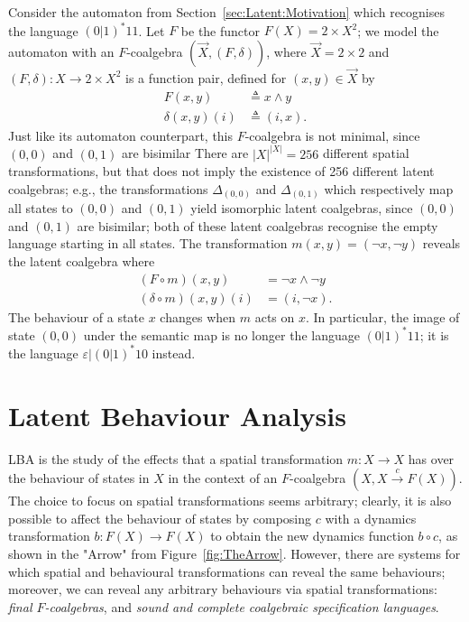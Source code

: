 \begin{example}
\label{ex:Latent:TheExample}
Consider the automaton from Section~\ref{sec:Latent:Motivation} which recognises the language $(0|1)^*11$. Let $F$ be the functor $F(X)=2\times X^2$; we model the automaton with an $F$-coalgebra $(\vec{X},(F,\delta))$, where $\vec{X}=2\times2$ and $(F,\delta)\colon X\rightarrow 2\times X^2$ is a function pair, defined for $(x,y)\in \vec{X}$ by
\begin{align}
    F(x,y)&\triangleq x \land y\\
    \delta(x,y)(i)&\triangleq (i,x).
\end{align}
Just like its automaton counterpart, this $F$-coalgebra is not minimal, since $(0,0)$ and $(0,1)$ are bisimilar
There are $|X|^{|X|}=256$ different spatial transformations, but that does not imply the existence of 256 different latent coalgebras; e.g., the transformations $\Delta_{(0,0)}$ and $\Delta_{(0,1)}$ which respectively map all states to $(0,0)$ and $(0,1)$ yield isomorphic latent coalgebras, since $(0,0)$ and $(0,1)$ are bisimilar; both of these latent coalgebras recognise the empty language starting in all states. 
The transformation $m(x,y)=(\lnot x,\lnot y)$ reveals the latent coalgebra where 
\begin{align}
    (F\circ m)(x,y)&= \lnot x \land \lnot y\\
    (\delta\circ m)(x,y)(i)&= (i,\lnot x).
\end{align}
The behaviour of a state $x$ changes when $m$ acts on $x$. In particular, the image of state $(0,0)$ under the semantic map is no longer the language $(0|1)^*11$; it is the language $\varepsilon|(0|1)^*10$ instead.
\end{example}
\section{Latent Behaviour Analysis}
LBA is the study of the effects that a spatial transformation $m\colon X\rightarrow X$ has over the behaviour of states in $X$ in the context of an $F$-coalgebra $(X,X\xrightarrow{c} F(X))$. The choice to focus on spatial transformations seems arbitrary; clearly, it is also possible to affect the behaviour of states by composing $c$ with a {dynamics transformation} $b\colon F(X)\rightarrow F(X)$ to obtain the new dynamics function $b \circ c$, as shown in the "Arrow" from Figure~\ref{fig:TheArrow}. %
However, there are systems for which spatial and behavioural transformations can reveal the same behaviours; moreover, we can reveal any arbitrary behaviours via spatial transformations: \emph{final $F$-coalgebras}, and \emph{sound and complete coalgebraic specification languages}.

